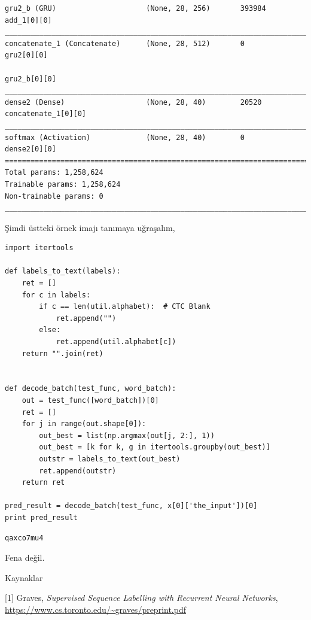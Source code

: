 \documentclass[12pt,fleqn]{article}\usepackage{../../common}
\begin{document}
\begin{verbatim}
gru2_b (GRU)                     (None, 28, 256)       393984      add_1[0][0]                      
____________________________________________________________________________________________________
concatenate_1 (Concatenate)      (None, 28, 512)       0           gru2[0][0]                       
                                                                   gru2_b[0][0]                     
____________________________________________________________________________________________________
dense2 (Dense)                   (None, 28, 40)        20520       concatenate_1[0][0]              
____________________________________________________________________________________________________
softmax (Activation)             (None, 28, 40)        0           dense2[0][0]                     
====================================================================================================
Total params: 1,258,624
Trainable params: 1,258,624
Non-trainable params: 0
____________________________________________________________________________________________________
\end{verbatim}

Şimdi üstteki örnek imajı tanımaya uğraşalım,

\begin{verbatim}
import itertools

def labels_to_text(labels):
    ret = []
    for c in labels:
        if c == len(util.alphabet):  # CTC Blank
            ret.append("")
        else:
            ret.append(util.alphabet[c])
    return "".join(ret)


def decode_batch(test_func, word_batch):
    out = test_func([word_batch])[0]
    ret = []
    for j in range(out.shape[0]):
        out_best = list(np.argmax(out[j, 2:], 1))
        out_best = [k for k, g in itertools.groupby(out_best)]
        outstr = labels_to_text(out_best)
        ret.append(outstr)
    return ret

pred_result = decode_batch(test_func, x[0]['the_input'])[0]
print pred_result
\end{verbatim}

\begin{verbatim}
qaxco7mu4
\end{verbatim}

Fena değil.

Kaynaklar

[1] Graves, {\em Supervised Sequence Labelling with Recurrent Neural Networks}, 
    \url{https://www.cs.toronto.edu/~graves/preprint.pdf}
\end{document}
